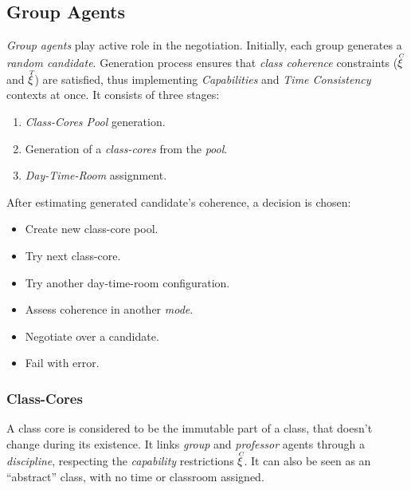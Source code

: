 \documentclass[../../ThesisDoc]{subfiles}
\begin{document}
\providecommand{\rootdir}{../..}


\subsection{Group Agents}

\emph{Group agents} play active role in the negotiation.
Initially, each group generates a \emph{random candidate}.
Generation process ensures that \emph{class coherence} constraints
($\accentset{C}{\xi}$ and $\accentset{T}{\xi}$) are satisfied, thus implementing \textit{Capabilities}
and \textit{Time Consistency} contexts at once. It consists of three stages:
\begin{enumerate}
  \item \emph{Class-Cores Pool} generation.
  \item Generation of a \emph{class-cores} from the \emph{pool}.
  \item \emph{Day-Time-Room} assignment.
\end{enumerate}

\noindent
After estimating generated candidate's coherence, a decision is chosen:\\
\begin{itemize}
  \item Create new class-core pool.
  \item Try next class-core.
  \item Try another day-time-room configuration.
  \item Assess coherence in another \emph{mode}.
  \item Negotiate over a candidate.
  \item Fail with error.
\end{itemize}


\subsubsection{Class-Cores}
A class core is considered to be the immutable part of a class, that doesn't
change during its existence. It links \emph{group} and \emph{professor} agents
through a \emph{discipline}, respecting the \emph{capability} restrictions $\accentset{C}{\xi}$.
It can also be seen as an ``abstract'' class, with no time or classroom assigned.
\end{document}
